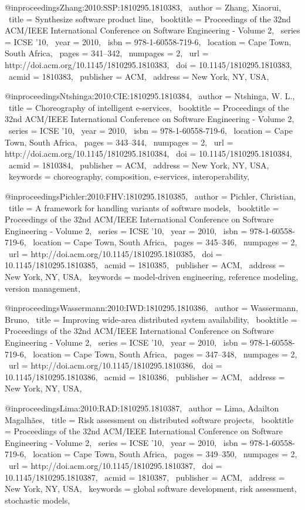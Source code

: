 @inproceedings{Zhang:2010:SSP:1810295.1810383,
 author = {Zhang, Xiaorui},
 title = {Synthesize software product line},
 booktitle = {Proceedings of the 32nd ACM/IEEE International Conference on Software Engineering - Volume 2},
 series = {ICSE '10},
 year = {2010},
 isbn = {978-1-60558-719-6},
 location = {Cape Town, South Africa},
 pages = {341--342},
 numpages = {2},
 url = {http://doi.acm.org/10.1145/1810295.1810383},
 doi = {10.1145/1810295.1810383},
 acmid = {1810383},
 publisher = {ACM},
 address = {New York, NY, USA},
} 

@inproceedings{Ntshinga:2010:CIE:1810295.1810384,
 author = {Ntshinga, W. L.},
 title = {Choreography of intelligent e-services},
 booktitle = {Proceedings of the 32nd ACM/IEEE International Conference on Software Engineering - Volume 2},
 series = {ICSE '10},
 year = {2010},
 isbn = {978-1-60558-719-6},
 location = {Cape Town, South Africa},
 pages = {343--344},
 numpages = {2},
 url = {http://doi.acm.org/10.1145/1810295.1810384},
 doi = {10.1145/1810295.1810384},
 acmid = {1810384},
 publisher = {ACM},
 address = {New York, NY, USA},
 keywords = {choreography, composition, e-services, interoperability},
} 

@inproceedings{Pichler:2010:FHV:1810295.1810385,
 author = {Pichler, Christian},
 title = {A framework for handling variants of software models},
 booktitle = {Proceedings of the 32nd ACM/IEEE International Conference on Software Engineering - Volume 2},
 series = {ICSE '10},
 year = {2010},
 isbn = {978-1-60558-719-6},
 location = {Cape Town, South Africa},
 pages = {345--346},
 numpages = {2},
 url = {http://doi.acm.org/10.1145/1810295.1810385},
 doi = {10.1145/1810295.1810385},
 acmid = {1810385},
 publisher = {ACM},
 address = {New York, NY, USA},
 keywords = {model-driven engineering, reference modeling, version management},
} 

@inproceedings{Wassermann:2010:IWD:1810295.1810386,
 author = {Wassermann, Bruno},
 title = {Improving wide-area distributed system availability},
 booktitle = {Proceedings of the 32nd ACM/IEEE International Conference on Software Engineering - Volume 2},
 series = {ICSE '10},
 year = {2010},
 isbn = {978-1-60558-719-6},
 location = {Cape Town, South Africa},
 pages = {347--348},
 numpages = {2},
 url = {http://doi.acm.org/10.1145/1810295.1810386},
 doi = {10.1145/1810295.1810386},
 acmid = {1810386},
 publisher = {ACM},
 address = {New York, NY, USA},
} 

@inproceedings{Lima:2010:RAD:1810295.1810387,
 author = {Lima, Adailton Magalh\~{a}es},
 title = {Risk assessment on distributed software projects},
 booktitle = {Proceedings of the 32nd ACM/IEEE International Conference on Software Engineering - Volume 2},
 series = {ICSE '10},
 year = {2010},
 isbn = {978-1-60558-719-6},
 location = {Cape Town, South Africa},
 pages = {349--350},
 numpages = {2},
 url = {http://doi.acm.org/10.1145/1810295.1810387},
 doi = {10.1145/1810295.1810387},
 acmid = {1810387},
 publisher = {ACM},
 address = {New York, NY, USA},
 keywords = {global software development, risk assessment, stochastic models},
} 

